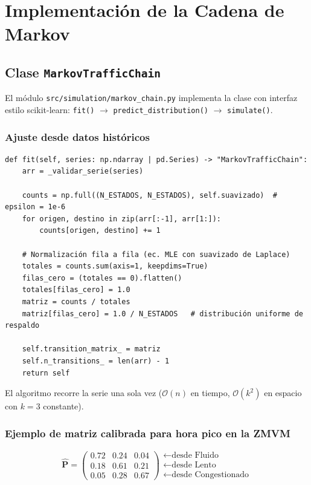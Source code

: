 \documentclass[12pt, a4paper]{article}
\theoremstyle{definition}
\begin{document}
\section{Implementación de la Cadena de Markov}

\subsection{Clase \texttt{MarkovTrafficChain}}

El módulo \texttt{src/simulation/markov\_chain.py} implementa la clase con
interfaz estilo scikit-learn: \texttt{fit()} $\to$ \texttt{predict\_distribution()}
$\to$ \texttt{simulate()}.

\subsubsection*{Ajuste desde datos históricos}

\begin{lstlisting}[caption={Estimación de la matriz de transición por conteo de transiciones.}]
def fit(self, series: np.ndarray | pd.Series) -> "MarkovTrafficChain":
    arr = _validar_serie(series)

    counts = np.full((N_ESTADOS, N_ESTADOS), self.suavizado)  # epsilon = 1e-6
    for origen, destino in zip(arr[:-1], arr[1:]):
        counts[origen, destino] += 1

    # Normalización fila a fila (ec. MLE con suavizado de Laplace)
    totales = counts.sum(axis=1, keepdims=True)
    filas_cero = (totales == 0).flatten()
    totales[filas_cero] = 1.0
    matriz = counts / totales
    matriz[filas_cero] = 1.0 / N_ESTADOS   # distribución uniforme de respaldo

    self.transition_matrix_ = matriz
    self.n_transitions_ = len(arr) - 1
    return self
\end{lstlisting}

El algoritmo recorre la serie una sola vez ($\mathcal{O}(n)$ en tiempo,
$\mathcal{O}(k^2)$ en espacio con $k=3$ constante).

\subsubsection*{Ejemplo de matriz calibrada para hora pico en la ZMVM}

\begin{equation}
    \hat{\mathbf{P}} =
    \begin{pmatrix}
        0.72 & 0.24 & 0.04 \\
        0.18 & 0.61 & 0.21 \\
        0.05 & 0.28 & 0.67
    \end{pmatrix}
    \begin{matrix}
        \leftarrow \text{desde Fluido} \\
        \leftarrow \text{desde Lento} \\
        \leftarrow \text{desde Congestionado}
    \end{matrix}
    \label{eq:example_matrix}
\end{equation}
\end{document}
